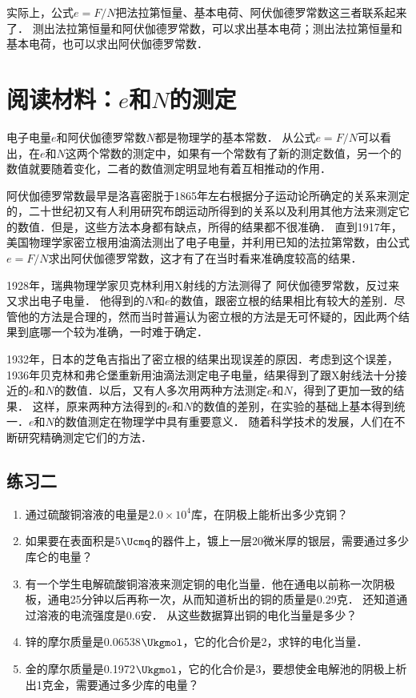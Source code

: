 实际上，公式$e=F/N$把法拉第恒量、基本电荷、阿伏伽德罗常数这三者联系起来了．
测出法拉第恒量和阿伏伽德罗常数，可以求出基本电荷；测出法拉第恒量和基本电荷，也可以求出阿伏伽德罗常数．

\section*{阅读材料：$e$和$N$的测定}
电子电量$e$和阿伏伽德罗常数$N$都是物理学的基本常数．
从公式$e=F/N$可以看出，在$e$和$N$这两个常数的测定中，如果有一个常数有了新的测定数值，另一个的数值就要随着变化，二者的数值测定明显地有着互相推动的作用．

阿伏伽德罗常数最早是洛喜密脱于1865年左右根据分子运动论所确定的关系来测定的，二十世纪初又有人利用研究布朗运动所得到的关系以及利用其他方法来测定它的数值．但是，这些方法本身都有缺点，所得的结果都不很准确．
直到1917年，美国物理学家密立根用油滴法测出了电子电量，并利用已知的法拉第常数，由公式$e=F/N$求出阿伏伽德罗常数，这才有了在当时看来准确度较高的结果．

1928年，瑞典物理学家贝克林利用X射线的方法测得了
阿伏伽德罗常数，反过来又求出电子电量．
他得到的$N$和$e$的数值，跟密立根的结果相比有较大的差别．尽管他的方法是合理的，然而当时普遍认为密立根的方法是无可怀疑的，因此两个结果到底哪一个较为准确，一时难于确定．

1932年，日本的芝龟吉指出了密立根的结果出现误差的原因．考虑到这个误差，1936年贝克林和弗仑堡重新用油滴法测定电子电量，结果得到了跟X射线法十分接近的$e$和$N$的数值．以后，又有人多次用两种方法测定$e$和$N$，得到了更加一致的结果．
这样，原来两种方法得到的$e$和$N$的数值的差别，在实验的基础上基本得到统一．$e$和$N$的数值测定在物理学中具有重要意义．
随着科学技术的发展，人们在不断研究精确测定它们的方法．

\subsection*{练习二}
\begin{enumerate}
    \item 通过硫酸铜溶液的电量是$2.0\times10^4$库，在阴极上能析出多少克铜？
    \item 如果要在表面积是5$\Ucmq$的器件上，镀上一层20微米厚的银层，需要通过多少库仑的电量？
    \item 有一个学生电解硫酸铜溶液来测定铜的电化当量．他在通电以前称一次阴极板，通电25分钟以后再称一次，从而知道析出的铜的质量是0.29克．
    还知道通过溶液的电流强度是0.6安．
    从这些数据算出铜的电化当量是多少？
    \item 锌的摩尔质量是0.06538$\Ukgmol$，它的化合价是2，求锌的电化当量．
    \item 金的摩尔质量是0.1972$\Ukgmol$，它的化合价是3，要想使金电解池的阴极上析出1克金，需要通过多少库的电量？
\end{enumerate}


